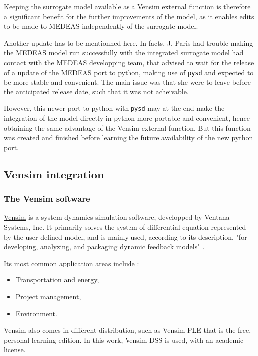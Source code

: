 Keeping the surrogate model available as a Vensim external function is therefore a significant benefit for the further improvements of the model, as it enables edits to be made to MEDEAS independently of the surrogate model.

Another update has to be mentionned here. In facts, J. Paris had trouble making the MEDEAS model run successfully with the integrated surrogate model had contact with the MEDEAS developping team, that advised to wait for the release of a update of the MEDEAS port to python, making use of \texttt{pysd} and expected to be more stable and convenient. The main issue was that she were to leave before the anticipated release date, such that it was not acheivable.

However, this newer port to python with \texttt{pysd} may at the end make the integration of the model directly in python more portable and convenient, hence obtaining the same advantage of the Vensim external function. But this function was created and finished before learning the future availability of the new python port.

\subsection{Vensim integration}

\subsubsection{The Vensim software}

\href{https://vensim.com/}{Vensim} is a system dynamics simulation software, developped by Ventana Systems, Inc. It primarily solves the system of differential equation represented by the user-defined model, and is mainly used, according to its description, "for developing, analyzing, and packaging dynamic feedback models" \cite{vensim-website}.

Its most common application areas include \cite{wiki-vensim}:
\begin{itemize}
    \item Transportation and energy,
    \item Project management,
    \item Environment.
\end{itemize}

Vensim also comes in different distribution, such as Vensim PLE that is the free, personal learning edition. In this work, Vensim DSS is used, with an academic license.


